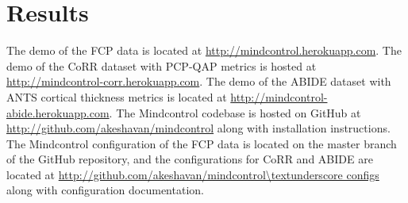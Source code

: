 \section{Results}

The demo of the FCP data is located at \url{http://mindcontrol.herokuapp.com}. The demo of the CoRR dataset with PCP-QAP metrics is hosted at \url{http://mindcontrol-corr.herokuapp.com}. The demo of the ABIDE dataset with ANTS cortical thickness metrics is located at \url{http://mindcontrol-abide.herokuapp.com}. The Mindcontrol codebase is hosted on GitHub at \url{http://github.com/akeshavan/mindcontrol} along with installation instructions. The Mindcontrol configuration of the FCP data is located on the master branch of the GitHub repository, and the configurations for CoRR and ABIDE are located at \url{http://github.com/akeshavan/mindcontrol\textunderscore configs} along with configuration documentation. 

